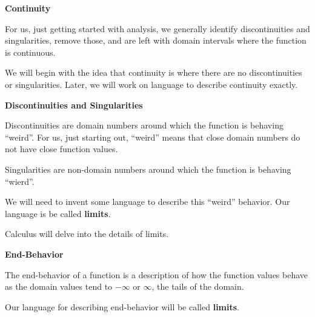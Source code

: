 \documentclass{ximera}
\begin{document}
\begin{explanation}  \textbf{\textcolor{red!75!green}{Continuity}} 

For us, just getting started with analysis, we generally identify discontinuities and singularities, remove those, and are left with domain intervals where the function is continuous. 


We will begin with the idea that continuity is where there are no discontinuities or singularities.  Later, we will work on language to describe continuity exactly.





\textbf{\textcolor{red!75!green}{Discontinuities and Singularities}} 

Discontinuities are domain numbers around which the function is behaving ``weird''. For us, just starting out, ``weird'' means that close domain numbers do not have close function values.   




Singularities are non-domain numbers around which the function is behaving ``wierd''.   


We will need to invent some language to describe this ``weird'' behavior.  Our language is be called \textbf{limits}.


Calculus will delve into the details of limits.


\end{explanation}







\begin{explanation}  \textbf{\textcolor{red!75!green}{End-Behavior}} 

The end-behavior of a function is a description of how the function values behave as the domain values tend to $-\infty$ or $\infty$, the tails of the domain. 


Our language for describing end-behavior will be called \textbf{limits}.

\end{explanation}
\end{document}
